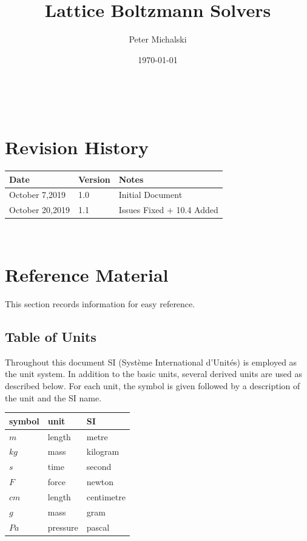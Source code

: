 \documentclass[12pt]{article}
\newcommand{\famname}{Lattice Boltzmann Solvers} %
\begin{document}
\title{\famname} 
\author{Peter Michalski}
\date{\today}

\maketitle

~\newpage


\section{Revision History}

\begin{tabularx}{\textwidth}{p{3cm}p{2cm}X}
\toprule {\bf Date} & {\bf Version} & {\bf Notes}\\
\midrule
October 7,2019 & 1.0 & Initial Document\\
October 20,2019 & 1.1 & Issues Fixed + 10.4 Added\\
\bottomrule
\end{tabularx}

~\newpage
	
\section{Reference Material}

This section records information for easy reference.

\subsection{Table of Units}

Throughout this document SI (Syst\`{e}me International d'Unit\'{e}s) is employed
as the unit system.  In addition to the basic units, several derived units are
used as described below.  For each unit, the symbol is given followed by a
description of the unit and the SI name.
~\newline

\renewcommand{\arraystretch}{1.2}
  \noindent \begin{tabular}{l l l} 
    \toprule		
    \textbf{symbol} & \textbf{unit} & \textbf{SI}\\
    \midrule 
    $m$ & length & metre\\
    $kg$ & mass	& kilogram\\
    $s$ & time & second\\
    $F$ & force & newton\\
    $cm$ & length & centimetre\\
    $g$ & mass & gram \\
    $Pa$ & pressure & pascal\\
    \bottomrule
  \end{tabular}
\end{document}
